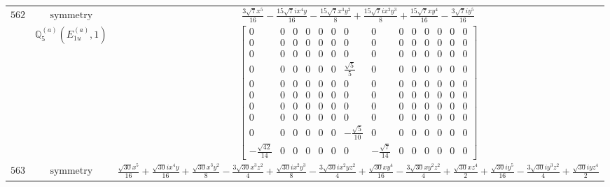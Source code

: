\documentclass[fleqn,8pt,landscape]{jsarticle}
\begin{document}
\begin{longtable}{ccc}
$ 562 $ & $ \text{symmetry} $ & $ \frac{3 \sqrt{7} x^{5}}{16} - \frac{15 \sqrt{7} i x^{4} y}{16} - \frac{15 \sqrt{7} x^{3} y^{2}}{8} + \frac{15 \sqrt{7} i x^{2} y^{3}}{8} + \frac{15 \sqrt{7} x y^{4}}{16} - \frac{3 \sqrt{7} i y^{5}}{16} $ \\
$  $ & $ \mathbb{Q}_{5}^{(a)}(E_{1u}^{(a)},1) $ & $ \begin{bmatrix} 0 & 0 & 0 & 0 & 0 & 0 & 0 & 0 & 0 & 0 & 0 & 0 & 0 & 0 \\ 0 & 0 & 0 & 0 & 0 & 0 & 0 & 0 & 0 & 0 & 0 & 0 & 0 & 0 \\ 0 & 0 & 0 & 0 & 0 & 0 & 0 & 0 & 0 & 0 & 0 & 0 & 0 & 0 \\ 0 & 0 & 0 & 0 & 0 & 0 & \frac{\sqrt{5}}{5} & 0 & 0 & 0 & 0 & 0 & 0 & 0 \\ 0 & 0 & 0 & 0 & 0 & 0 & 0 & 0 & 0 & 0 & 0 & 0 & 0 & 0 \\ 0 & 0 & 0 & 0 & 0 & 0 & 0 & 0 & 0 & 0 & 0 & 0 & 0 & 0 \\ 0 & 0 & 0 & 0 & 0 & 0 & 0 & 0 & 0 & 0 & 0 & 0 & 0 & 0 \\ 0 & 0 & 0 & 0 & 0 & 0 & 0 & 0 & 0 & 0 & 0 & 0 & 0 & 0 \\ 0 & 0 & 0 & 0 & 0 & 0 & - \frac{\sqrt{5}}{10} & 0 & 0 & 0 & 0 & 0 & 0 & 0 \\ - \frac{\sqrt{42}}{14} & 0 & 0 & 0 & 0 & 0 & 0 & - \frac{\sqrt{7}}{14} & 0 & 0 & 0 & 0 & 0 & 0 \end{bmatrix} $ \\ \hline
$ 563 $ & $ \text{symmetry} $ & $ \frac{\sqrt{30} x^{5}}{16} + \frac{\sqrt{30} i x^{4} y}{16} + \frac{\sqrt{30} x^{3} y^{2}}{8} - \frac{3 \sqrt{30} x^{3} z^{2}}{4} + \frac{\sqrt{30} i x^{2} y^{3}}{8} - \frac{3 \sqrt{30} i x^{2} y z^{2}}{4} + \frac{\sqrt{30} x y^{4}}{16} - \frac{3 \sqrt{30} x y^{2} z^{2}}{4} + \frac{\sqrt{30} x z^{4}}{2} + \frac{\sqrt{30} i y^{5}}{16} - \frac{3 \sqrt{30} i y^{3} z^{2}}{4} + \frac{\sqrt{30} i y z^{4}}{2} $ \\

\end{longtable}
\end{document}
